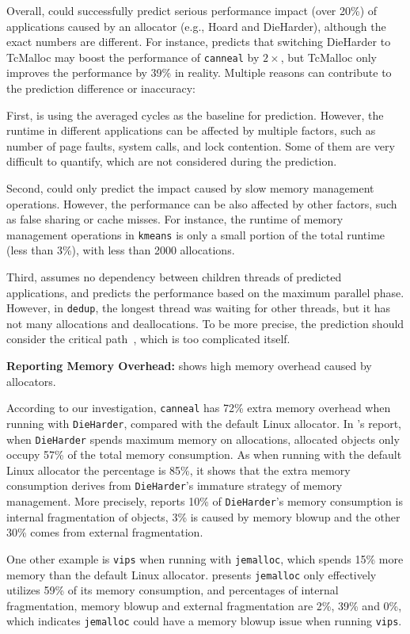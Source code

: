 Overall, \MP{} could successfully predict serious performance impact (over 20\%) of  applications caused by an allocator (e.g., Hoard and DieHarder), although the exact numbers are different. For instance, \MP{} predicts that switching DieHarder to TcMalloc may boost the performance of \texttt{canneal} by $2\times$, but TcMalloc only improves the performance by 39\% in reality. Multiple reasons can contribute to the prediction difference or inaccuracy:

First, \MP{} is using the averaged cycles as the baseline for prediction. However, the  runtime in different applications can be affected by multiple factors, such as number of page faults, system calls, and lock contention. Some of them are very difficult to quantify, which are not considered during the prediction. 

Second, \MP{} could only predict the impact caused by slow memory management operations. However, the performance can be also affected by other factors, such as false sharing or cache misses. For instance, the runtime of memory management operations in \texttt{kmeans} is only a small portion of the total runtime (less than 3\%), with less than 2000 allocations. 

Third, \MP{} assumes no dependency between children threads of predicted applications, and predicts the performance based on the maximum parallel phase. However, in \texttt{dedup}, the longest thread was waiting for other threads, but it has not many allocations and deallocations. To be more precise, the prediction should consider the critical path~\cite{wPerf}, which is too complicated itself.

\textbf{Reporting Memory Overhead:} 
\MP{} shows high memory overhead caused by  allocators. 

According to our investigation, \texttt{canneal} has 72\% extra memory overhead when running with \texttt{DieHarder}, compared with the default Linux allocator. 
In \MP{}'s report, when \texttt{DieHarder} spends maximum memory on allocations, allocated objects only occupy 57\% of the total memory consumption. As when running with the default Linux allocator the percentage is 85\%, it shows that the extra memory consumption derives from \texttt{DieHarder}'s immature strategy of memory management. More precisely, \MP{} reports 10\% of \texttt{DieHarder}'s memory consumption is internal fragmentation of objects, 3\% is caused by memory blowup and the other 30\% comes from external fragmentation. 

One other example is \texttt{vips} when running with \texttt{jemalloc}, which spends 15\% more memory than the default Linux allocator. \MP{} presents \texttt{jemalloc} only effectively utilizes 59\% of its memory consumption, and percentages of internal fragmentation, memory blowup and external fragmentation are 2\%, 39\% and 0\%, which indicates \texttt{jemalloc} could have a memory blowup issue when running \texttt{vips}.

